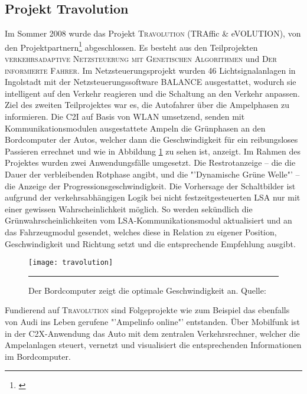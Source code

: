 \subsection*{\label{sec:travolution}Projekt Travolution}
Im Sommer 2008 wurde das Projekt \textsc{Travolution} (TRAffic \& eVOLUTION), von den Projektpartnern\footnote{\cite{Travolution}} abgeschlossen. Es besteht aus den Teilprojekten \textsc{verkehrsadaptive Netzsteuerung mit Genetischen Algorithmen} und \textsc{Der informierte Fahrer}. Im Netzsteuerungsprojekt wurden 46 Lichtsignalanlagen in Ingolstadt mit der Netzsteuerungssoftware BALANCE ausgestattet, wodurch sie intelligent auf den Verkehr reagieren und die Schaltung an den Verkehr anpassen.  Ziel des zweiten Teilprojektes war es, die Autofahrer über die Ampelphasen zu informieren. Die \gls{C2I} auf Basis von \gls{WLAN} umsetzend, senden mit Kommunikationsmodulen ausgestattete Ampeln die Grünphasen an den Bordcomputer der Autos, welcher dann die Geschwindigkeit für ein reibungsloses Passieren errechnet\cite{Stvtechnik} und wie in Abbildung \ref{fig:travolution} zu sehen ist, anzeigt. Im Rahmen des Projektes wurden zwei Anwendungsfälle umgesetzt. Die Restrotanzeige -- die die Dauer der verbleibenden Rotphase angibt, und die "'Dynamische Grüne Welle"' -- die Anzeige der Progressionsgeschwindigkeit.
Die Vorhersage der Schaltbilder ist aufgrund der verkehrsabhängigen Logik bei nicht festzeitgesteuerten \gls{LSA} nur mit einer gewissen Wahrscheinlichkeit möglich. So werden sekündlich die Grünwahrscheinlichkeiten vom \gls{LSA}-Kommunikationsmodul aktualisiert und an das Fahrzeugmodul gesendet, welches diese in Relation zu eigener Position, Geschwindigkeit und Richtung setzt und die entsprechende Empfehlung ausgibt.
\begin{figure}[H]  
    \centering  
    \texttt{[image: travolution]}   
    \rule{35em}{0.5pt}   
    \caption[Projekt Travolution]{Der Bordcomputer zeigt die optimale Geschwindigkeit an. Quelle: \cite{Travolution}}
    \label{fig:travolution}
\end{figure} 
Fundierend auf \textsc{Travolution} sind Folgeprojekte wie zum Beispiel das ebenfalls von Audi ins Leben gerufene "'Ampelinfo online"' entstanden. Über Mobilfunk ist in der \gls{C2X}-Anwendung das Auto mit dem zentralen Verkehrsrechner, welcher die Ampelanlagen steuert, vernetzt und visualisiert die entsprechenden Informationen im Bordcomputer. \cite{Ampelinfo}
